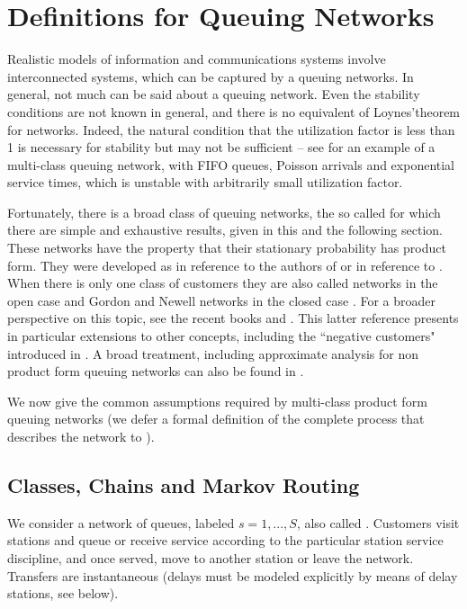 \section{Definitions for Queuing Networks}\label{sec-qn}

Realistic models of information and communications systems
involve interconnected systems, which can be captured by a
queuing networks. In general, not much can be said about a
queuing network. Even the stability conditions are not known in
general, and there is no equivalent of Loynes'theorem for
networks. Indeed, the natural condition that the utilization
factor is less than 1 is necessary for stability but may not be
sufficient -- see \cite{bramson1994instability} for an example
of a multi-class queuing network, with FIFO queues, Poisson
arrivals and exponential service times, which is unstable with
arbitrarily small utilization factor.

Fortunately, there is a broad class of queuing
networks, the so called  for which there are simple
and exhaustive results, given in this and the
following section. These networks have the
property that their stationary probability has
product form. They were developed as 
 in reference to the authors of \cite{baskett1975open}
or  in reference to
\cite{kelly1979reversibility}. When there is only one class of
customers they are also called  networks in the
open case \cite{jackson1963jobshop} and Gordon and Newell
networks in the closed case \cite{gordon1967closed}. For a
broader perspective on this topic, see the recent books
\cite{serfozo1999introduction} and \cite{chao1999queueing}.
This latter reference presents in particular extensions to
other concepts, including the ``negative customers" introduced
in \cite{gelenbe1991product}. A broad treatment, including
approximate analysis for non product form queuing networks can
also be found in \cite{van1993queueing}.
%
%
%

We now give the common assumptions required by
multi-class product form queuing networks (we
defer a formal definition of the complete process
that describes the network to
).

\subsection{Classes, Chains and Markov Routing}
\label{q-qnet-routing}
We consider a network of queues, labeled $s=1,
...,S$, also called . Customers
visit stations and queue or receive service
according to the particular station service
discipline, and once served, move to another
station or leave the network. Transfers are
instantaneous (delays must be modeled explicitly
by means of delay stations, see below).

